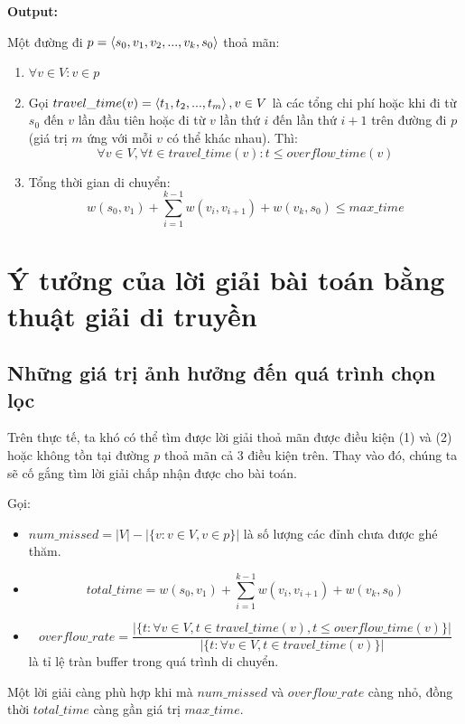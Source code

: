 \documentclass[12pt]{report}
\begin{document}
\textbf{Output:} 

Một đường đi $p=\braket{s_0, v_1, v_2, ..., v_k, s_0}$ thoả mãn: 
\begin{enumerate}
\item $\forall v \in V: v \in p$
\item Gọi $travel\_time(v) = \braket{t_1, t_2, ..., t_m}, v \in V$ là các tổng chi phí hoặc khi đi từ $s_0$ đến $v$ lần đầu tiên hoặc đi từ $v$ lần thứ $i$ đến lần thứ $i + 1$ trên đường đi $p$ (giá trị $m$ ứng với mỗi $v$ có thể khác nhau). Thì: 
	$$\forall v \in V, \forall t \in travel\_time(v): t \leq overflow\_time(v) $$
\item Tổng thời gian di chuyển:
	$$w(s_0, v_1) + \sum_{i = 1} ^ {k - 1} w(v_i, v_{i + 1}) + w(v_k, s_0) \leq max\_time$$
\end{enumerate}

\section{Ý tưởng của lời giải bài toán bằng thuật giải di truyền}
\subsection{Những giá trị ảnh hưởng đến quá trình chọn lọc}
Trên thực tế, ta khó có thể tìm được lời giải thoả mãn được điều kiện (1) và (2) hoặc không tồn tại đường $p$ thoả mãn cả 3 điều kiện trên. Thay vào đó, chúng ta sẽ cố gắng tìm lời giải chấp nhận được cho bài toán.

\vspace{5mm}
Gọi:
\begin{itemize}
\item $num\_missed = |V| - |\{v: v \in V, v \in p\}|$ là số lượng các đỉnh chưa được ghé thăm. 
\item $$total\_time = w(s_0, v_1) + \sum_{i = 1} ^ {k - 1} w(v_i, v_{i + 1}) + w(v_k, s_0)$$
\item $$overflow\_rate = \frac{|\{t: \forall v \in V, t \in travel\_time(v), t \leq overflow\_time(v)\}| }{|\{t: \forall v \in V, t \in travel\_time(v)\}|}$$ là tỉ lệ tràn buffer trong quá trình di chuyển. 
\end{itemize}

Một lời giải càng phù hợp khi mà $num\_missed$ và $overflow\_rate$ càng nhỏ, đồng thời $total\_time$ càng gần giá trị $max\_time$.
\end{document}
